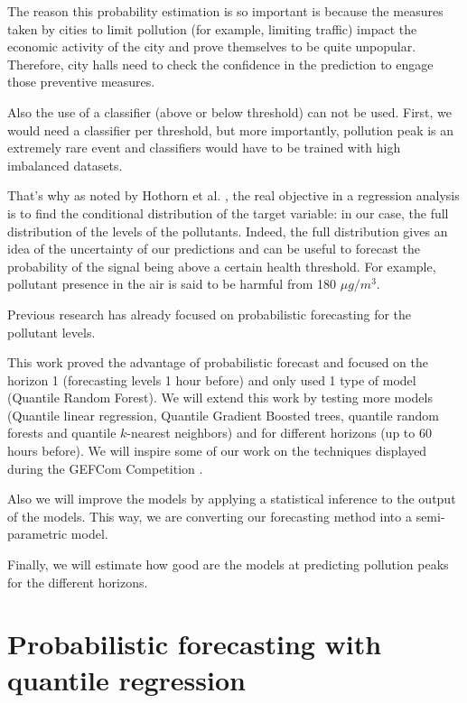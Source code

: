 \documentclass[a4paper,twocolumn,5p]{elsarticle}
\begin{document}
The reason this probability estimation is so important is because 
the measures taken by cities to limit pollution (for example,
limiting traffic) impact the 
economic activity of the city and prove themselves to be quite
 unpopular. 
Therefore, city halls need to check the confidence in the 
prediction to engage those preventive measures.

Also the use of a classifier (above or below threshold) can not 
be used. First, we would need a classifier per threshold, but 
more importantly, pollution peak is an extremely rare event and 
classifiers would have to be trained with high imbalanced datasets.

That's why as noted by Hothorn et al. \cite{hothorn_conditional_2014},
the real objective in a regression analysis is to find the conditional
distribution of the target variable: in our case, the full 
distribution of the levels of the pollutants. Indeed, the full
distribution gives an idea of the uncertainty of our predictions and
can be useful to forecast the probability of the signal being above a
certain health threshold.  For example, \no pollutant presence in
the air is said to be harmful from 180 $\mu g / m^3$. 

Previous research \cite{proba_aznarte} has already focused on
probabilistic forecasting for the \no pollutant levels.

This work proved the advantage of probabilistic forecast and focused
on the horizon 1 (forecasting levels 1 hour before) and only used 1
type of model (Quantile Random Forest). We will extend this work by
testing more models (Quantile linear regression, Quantile Gradient 
Boosted
trees, quantile random forests and quantile $k$-nearest neighbors) 
and for different horizons (up to 60 hours
before).  We will inspire some of our work on the techniques displayed
during the GEFCom Competition \cite{mangalova_k-nearest_2016}
\cite{hong_probabilistic_2016}.

Also we will improve the models by applying a statistical
inference to the output of the models. This way, we are converting our
forecasting method into a semi-parametric model.

Finally, we will estimate how good are the models at predicting 
pollution peaks for the different horizons.

\section{Probabilistic forecasting with quantile regression}
\label{sec:probForec}
\end{document}
